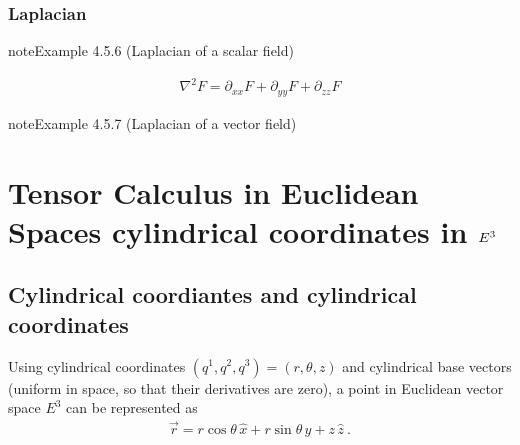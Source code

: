 \documentclass[letterpaper,10pt,english]{jupyterBook}
\begin{document}
\subsubsection{Laplacian}
\label{\detokenize{ch/tensor-algebra-calculus/calculus-euclidean-cartesian:laplacian}}\label{\detokenize{ch/tensor-algebra-calculus/calculus-euclidean-cartesian:tensor-calculus-cartesian-differential-operators-laplacian}}\label{ch/tensor-algebra-calculus/calculus-euclidean-cartesian:example-5}
\begin{sphinxadmonition}{note}{Example 4.5.6 (Laplacian of a scalar field)}


\begin{equation*}
\begin{split}\nabla^2 F = \partial_{xx} F + \partial_{yy} F + \partial_{zz} F\end{split}
\end{equation*}\end{sphinxadmonition}
\label{ch/tensor-algebra-calculus/calculus-euclidean-cartesian:example-6}
\begin{sphinxadmonition}{note}{Example 4.5.7 (Laplacian of a vector field)}


\end{sphinxadmonition}

\sphinxstepscope


\section{Tensor Calculus in Euclidean Spaces \sphinxhyphen{} cylindrical coordinates in \protect\(E^3\protect\)}
\label{\detokenize{ch/tensor-algebra-calculus/calculus-euclidean-cylindrical:tensor-calculus-in-euclidean-spaces-cylindrical-coordinates-in-e-3}}\label{\detokenize{ch/tensor-algebra-calculus/calculus-euclidean-cylindrical:tensor-calculus-cylindrical}}\label{\detokenize{ch/tensor-algebra-calculus/calculus-euclidean-cylindrical::doc}}

\subsection{Cylindrical coordiantes and cylindrical coordinates}
\label{\detokenize{ch/tensor-algebra-calculus/calculus-euclidean-cylindrical:cylindrical-coordiantes-and-cylindrical-coordinates}}\label{\detokenize{ch/tensor-algebra-calculus/calculus-euclidean-cylindrical:tensor-calculus-cylindrical-coordinates}}
\sphinxAtStartPar
Using cylindrical coordinates \((q^1, q^2, q^3) = (r, \theta, z)\) and cylindrical base vectors (uniform in space, so that their derivatives are zero), a point in Euclidean vector space \(E^3\) can be represented as
\begin{equation*}
\begin{split}\vec{r} = r \cos \theta \, \hat{x} + r \sin \theta \, \hat{y} + z \, \hat{z} \ .\end{split}
\end{equation*}
\end{document}

